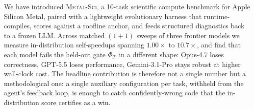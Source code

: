 \documentclass{article}
\theoremstyle{plain}
\theoremstyle{definition}
\theoremstyle{remark}
\begin{document}
We have introduced \textsc{Metal-Sci}, a 10-task scientific compute benchmark for Apple Silicon Metal, paired with a lightweight evolutionary harness that runtime-compiles, scores against a roofline anchor, and feeds structured diagnostics back to a frozen LLM. Across matched $(1{+}1)$ sweeps of three frontier models we measure in-distribution self-speedups spanning $1.00\times$ to $10.7\times$, and find that each model fails the held-out gate $\Phi_\mathcal{T}$ in a different shape: Opus-4.7 loses correctness, GPT-5.5 loses performance, Gemini-3.1-Pro stays robust at higher wall-clock cost. The headline contribution is therefore not a single number but a methodological one: a single auxiliary configuration per task, withheld from the agent's feedback loop, is enough to catch confidently-wrong code that the in-distribution score certifies as a win.
\end{document}
